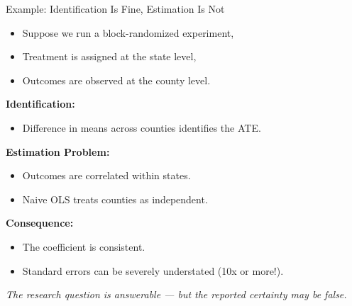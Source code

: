\documentclass[aspectratio=169, handout, t]{beamer}
\numberwithin{equation}{section}
\begin{document}
\begin{frame}{Example: Identification Is Fine, Estimation Is Not}

\begin{itemize}
 \item Suppose we run a block-randomized experiment,
 \item Treatment is assigned at the state level,
 \item Outcomes are observed at the county level.
\end{itemize}

\vspace{0.2cm}

\textbf{Identification:}
\begin{itemize}
    \item Difference in means across counties identifies the ATE.
\end{itemize}

\vspace{0.2cm}

\textbf{Estimation Problem:}
\begin{itemize}
    \item Outcomes are correlated within states.
    \item Naive OLS treats counties as independent.
\end{itemize}

\vspace{0.2cm}

\textbf{Consequence:}
\begin{itemize}
    \item The coefficient is consistent.
    \item Standard errors can be severely understated (10x or more!).
\end{itemize}

\vspace{0.1cm}

\begin{center}
\emph{The research question is answerable — but the reported certainty may be false.}
\end{center}

\end{frame}
\end{document}
